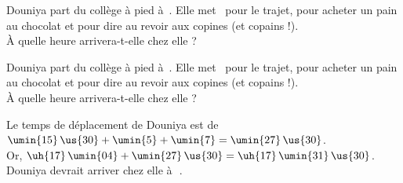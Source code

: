 \begin{exercice}
    Douniya part du collège à pied à \,. Elle met \, pour le trajet,  pour acheter un pain au chocolat et  pour dire au revoir aux copines (et copains !). \\
    À quelle heure arrivera-t-elle chez elle ?

 \end{exercice}
 
 \begin{corrige}
    Douniya part du collège à pied à \,. Elle met \, pour le trajet,  pour acheter un pain au chocolat et  pour dire au revoir aux copines (et copains !). \\
    À quelle heure arrivera-t-elle chez elle ?

    {\red Le temps de déplacement de Douniya est de \\
    $\umin{15}\,\us{30}+\umin{5}+\umin{7} =\umin{27}\,\us{30}$. \\
    Or, $\uh{17}\,\umin{04}+\umin{27}\,\us{30} =\uh{17}\,\umin{31}\,\us{30}$. \\
    Douniya devrait arriver chez elle à \,\,.
    }
 \end{corrige}